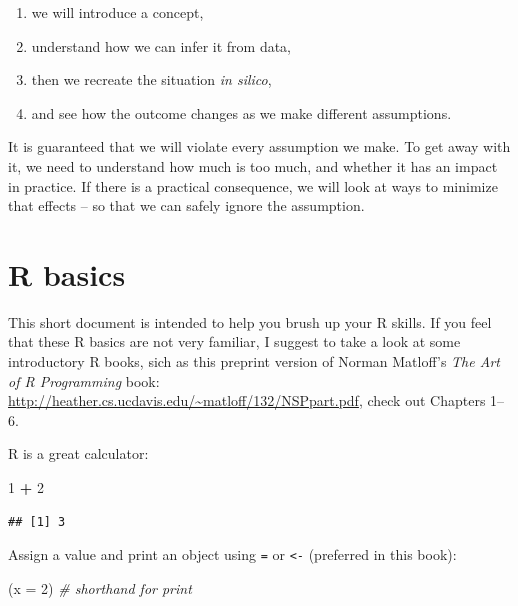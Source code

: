 \documentclass[12pt,]{book}
\newenvironment{Shaded}{\begin{snugshade}}{\end{snugshade}}
\newcommand{\CommentTok}[1]{\textcolor[rgb]{0.56,0.35,0.01}{\textit{#1}}}
\newcommand{\DataTypeTok}[1]{\textcolor[rgb]{0.13,0.29,0.53}{#1}}
\newcommand{\DecValTok}[1]{\textcolor[rgb]{0.00,0.00,0.81}{#1}}
\newcommand{\NormalTok}[1]{#1}
\newcommand{\OperatorTok}[1]{\textcolor[rgb]{0.81,0.36,0.00}{\textbf{#1}}}
\newcommand{\StringTok}[1]{\textcolor[rgb]{0.31,0.60,0.02}{#1}}
\providecommand{\tightlist}{%
  \setlength{\itemsep}{0pt}\setlength{\parskip}{0pt}}
\begin{document}
\begin{enumerate}
\def\labelenumi{\arabic{enumi}.}
\tightlist
\item
  we will introduce a concept,
\item
  understand how we can infer it from data,
\item
  then we recreate the situation \emph{in silico},
\item
  and see how the outcome changes as we make different assumptions.
\end{enumerate}

It is guaranteed that we will violate every assumption we make.
To get away with it, we need to understand how much is too much,
and whether it has an impact in practice.
If there is a practical consequence, we will look at ways to minimize
that effects -- so that we can safely ignore the assumption.

\hypertarget{r-basics}{%
\section{R basics}\label{r-basics}}

This short document is intended to help you brush up your R skills.
If you feel that these R basics are not very familiar,
I suggest to take a look at some introductory R books,
sich as this preprint version of Norman Matloff's \emph{The Art of R Programming} book: \url{http://heather.cs.ucdavis.edu/~matloff/132/NSPpart.pdf}, check out Chapters 1--6.

R is a great calculator:

\begin{Shaded}
\begin{Highlighting}[]
\DecValTok{1} \OperatorTok{+}\StringTok{ }\DecValTok{2}
\end{Highlighting}
\end{Shaded}

\begin{verbatim}
## [1] 3
\end{verbatim}

Assign a value and print an object using \texttt{=} or \texttt{\textless{}-} (preferred in this book):

\begin{Shaded}
\begin{Highlighting}[]
\NormalTok{(}\DataTypeTok{x =} \DecValTok{2}\NormalTok{) }\CommentTok{# shorthand for print}
\end{Highlighting}
\end{Shaded}
\end{document}
